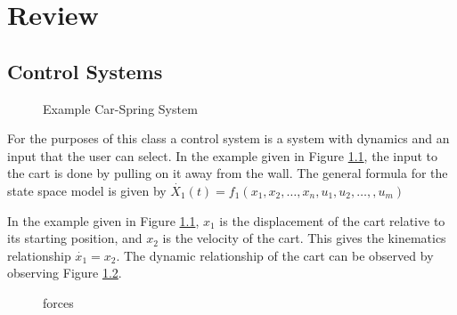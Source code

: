 \chapter{Review}

\section{Control Systems}

\begin{figure}[ht]
    \centering
    \caption{Example Car-Spring System}
    \label{fig:cart}
\end{figure}

For the purposes of this class a control system is a system with dynamics and an input that the user can select. In the example given in Figure \ref{fig:cart}, the input to the cart is done by pulling on it away from the wall. The general formula for the state space model is given by $\dot{X_1}(t) = f_1(x_1,x_2,\ldots,x_n,u_1,u_2,\ldots,,u_m)$

In the example given in Figure \ref{fig:cart}, $x_1$ is the displacement of the cart relative to its starting position, and $x_2$ is the velocity of the cart. This gives the kinematics relationship $\dot{x_1} = x_2$. The dynamic relationship of the cart can be observed by observing Figure \ref{fig:forces}.

\begin{figure}[ht]
    \centering
    \caption{forces}
    \label{fig:forces}
\end{figure}
